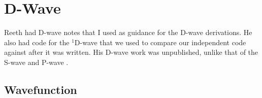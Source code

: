 \documentclass[Dissertation.tex]{subfiles}
\begin{document}
\chapter{D-Wave}
\label{chp:DWave}

\iftoggle{UNT}{Van}{\lettrine{\textcolor{startcolor}{V}}{an}}
Reeth \cite{VanReethPrivate}
had D-wave notes that I used as guidance for
the D-wave derivations. He also had code for the $^1$D-wave that we used to
compare our independent code against after it was written. His D-wave work was
unpublished, unlike that of the S-wave \cite{VanReeth2003,VanReeth2004}
and P-wave \cite{VanReeth2004}.


\section{Wavefunction}
\label{sec:DWaveFn}
\end{document}
